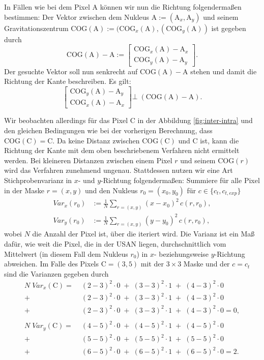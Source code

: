\documentclass[a4paper, 11pt]{report}
\theoremstyle{definition}
\begin{document}
			In Fällen wie bei dem Pixel A können wir nun die Richtung folgendermaßen bestimmen: Der Vektor zwischen dem Nukleus $\text{A} := (\text{A}_x, \text{A}_y)$ und seinem Gravitationszentrum $\text{COG}(\text{A}) := (\text{COG}_x(\text{A}), (\text{COG}_y(\text{A}))$ ist gegeben durch $$\text{COG}(\text{A}) - \text{A} := \begin{bmatrix}\text{COG}_x(\text{A}) - \text{A}_x \\ \text{COG}_y(\text{A}) - \text{A}_y\end{bmatrix}.$$
			Der gesuchte Vektor soll nun senkrecht auf $\text{COG}(\text{A}) - \text{A}$ stehen und damit die Richtung der Kante beschreiben. Es gilt:
			$$\begin{bmatrix}\text{COG}_y(\text{A}) - \text{A}_y \\ \text{COG}_x(\text{A}) - \text{A}_x\end{bmatrix} \bot \; \left(\text{COG}(\text{A}) - \text{A}\right).$$

			Wir beobachten allerdings für das Pixel C in der Abbildung \ref{fig:inter-intra} und den gleichen Bedingungen wie bei der vorherigen Berechnung, dass $\text{COG}(\text{C}) = \text{C}$. Da keine Distanz zwischen $\text{COG}(\text{C})$ und C ist, kann die Richtung der Kante mit dem oben beschriebenem Verfahren nicht ermittelt werden. Bei kleineren Distanzen zwischen einem Pixel $r$ und seinem $\text{COG}(r)$ wird das Verfahren zunehmend ungenau. Stattdessen nutzen wir eine Art Stichprobenvarianz in $x$- und $y$-Richtung folgendermaßen: Summiere für alle Pixel in der Maske $r = (x, y)$ und den Nukleus $r_0 = (x_0, y_0)$ für $c \in \{c_t, c_{t,exp}\}$
			\begin{align*}
				Var_{x}(r_0) &:= \frac{1}{N}\sum_{r=(x,y)} (x-x_0)^2 \, c(r,r_0), \\
				Var_{y}(r_0) &:= \frac{1}{N}\sum_{r=(x,y)} (y-y_0)^2 \, c(r,r_0),
 			\end{align*}
 			wobei $N$ die Anzahl der Pixel ist, über die iteriert wird.
 			Die Varianz ist ein Maß dafür, wie weit die Pixel, die in der USAN liegen, durchschnittlich vom \glqq Mittelwert\grqq{} (in diesem Fall dem Nukleus $r_0$) in $x$- beziehungsweise $y$-Richtung abweichen. Im Falle des Pixels $\text{C} = (3,5)$ mit der $3\times3$ Maske und der $c = c_t$ sind die Varianzen gegeben durch
 			\begin{align*}
 				N \; Var_x(\text{C}) 	=\; &(2-3)^2 \cdot 0 \;+\; (3-3)^2 \cdot 1 \;+\; (4-3)^2 \cdot 0  \\
 										+\; &(2-3)^2 \cdot 0 \;+\; (3-3)^2 \cdot 1 \;+\; (4-3)^2 \cdot 0  \\
 										+\; &(2-3)^2 \cdot 0 \;+\; (3-3)^2 \cdot 1 \;+\; (4-3)^2 \cdot 0  = 0, \\
 										\\
 				N \; Var_y(\text{C}) 	=\; &(4-5)^2 \cdot 0 \;+\; (4-5)^2 \cdot 1 \;+\; (4-5)^2 \cdot 0  \\
 										+\; &(5-5)^2 \cdot 0 \;+\; (5-5)^2 \cdot 1 \;+\; (5-5)^2 \cdot 0  \\
 										+\; &(6-5)^2 \cdot 0 \;+\; (6-5)^2 \cdot 1 \;+\; (6-5)^2 \cdot 0  = 2. \\& 
 			\end{align*}
 			
\end{document}
